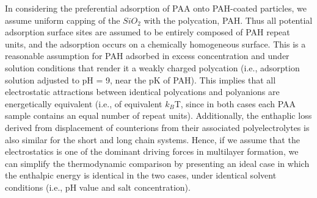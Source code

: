 \documentclass[journal=mamobx,manuscript=article]{achemso}
\begin{document}
In considering the preferential adsorption of PAA onto PAH-coated particles, we assume uniform capping of the $SiO_2$ with the polycation, PAH.  Thus all potential adsorption surface sites are assumed to be entirely composed of PAH repeat units, and the adsorption occurs on a chemically homogeneous surface.  This is a reasonable assumption for PAH adsorbed in excess concentration and under solution conditions that render it a weakly charged polycation (i.e., adsorption solution adjusted to pH = 9, near the pK of PAH).\cite{Burke2003,Smith2003}  This implies that all electrostatic attractions between identical polycations and polyanions are energetically equivalent (i.e., of equivalent $k_B$T, since in both cases each PAA sample contains an equal number of repeat units).\cite{Dubas1999}  Additionally, the enthaplic loss derived from displacement of counterions from their associated polyelectrolytes is also similar for the short and long chain systems.  Hence, if we assume that the electrostatics is one of the dominant driving forces in multilayer formation, we can simplify the thermodynamic comparison by presenting an ideal case in which the enthalpic energy is identical in the two cases, under identical solvent conditions (i.e., pH value and salt concentration). 
\end{document}
